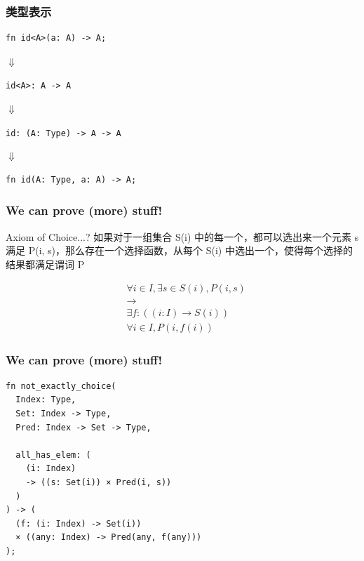 \documentclass[UTF-8]{ctexbeamer}
\begin{document}
\begin{frame}[fragile]
  \frametitle{类型表示}

  \begin{verbatim}
fn id<A>(a: A) -> A;
  \end{verbatim}

  \pause
  $\Downarrow$

  \texttt{id<A>: A -> A}

  \pause

  $\Downarrow$

  \texttt{id: (A: Type) -> A -> A}

  \pause
  $\Downarrow$

  \begin{verbatim}
fn id(A: Type, a: A) -> A;
  \end{verbatim}
\end{frame}

\begin{frame}[fragile]
  \frametitle{We can prove (more) stuff!}

  \begin{block}{Axiom of Choice...?}
  如果对于一组集合 S(i) 中的每一个，都可以选出来一个元素 s 满足 P(i, s)，那么存在一个选择函数，从每个 S(i) 中选出一个，使得每个选择的结果都满足谓词 P
  \end{block}

  \pause

  $$
  \begin{aligned}
  &\forall i \in I, \exists s \in S(i), P(i, s) \\
  &\rightarrow \\
  &\exists f: ((i: I) \rightarrow S(i)) \\
  &\forall i \in I, P(i, f(i))
  \end{aligned}
  $$
\end{frame}

\begin{frame}[fragile]
  \frametitle{We can prove (more) stuff!}

  \begin{verbatim}
fn not_exactly_choice(
  Index: Type,
  Set: Index -> Type,
  Pred: Index -> Set -> Type,

  all_has_elem: (
    (i: Index)
    -> ((s: Set(i)) × Pred(i, s))
  )
) -> (
  (f: (i: Index) -> Set(i))
  × ((any: Index) -> Pred(any, f(any)))
);
  \end{verbatim}
\end{frame}
\end{document}
